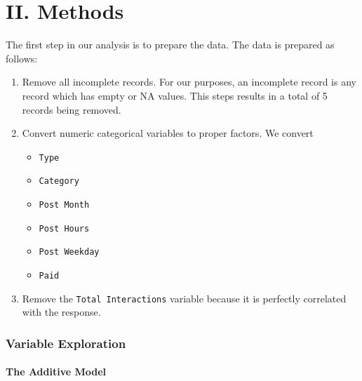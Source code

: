 \documentclass[
]{article}
\providecommand{\tightlist}{%
  \setlength{\itemsep}{0pt}\setlength{\parskip}{0pt}}
\begin{document}
\hypertarget{ii.-methods}{%
\section{\texorpdfstring{\textbf{II}.
Methods}{II. Methods}}\label{ii.-methods}}

The first step in our analysis is to prepare the data. The data is
prepared as follows:

\begin{enumerate}
\def\labelenumi{\arabic{enumi}.}
\tightlist
\item
  Remove all incomplete records. For our purposes, an incomplete record
  is any record which has empty or NA values. This steps results in a
  total of 5 records being removed.\\
\item
  Convert numeric categorical variables to proper factors. We convert

  \begin{itemize}
  \tightlist
  \item
    \texttt{Type}~\\
  \item
    \texttt{Category}~\\
  \item
    \texttt{Post\ Month}~\\
  \item
    \texttt{Post\ Hours}~\\
  \item
    \texttt{Post\ Weekday}~\\
  \item
    \texttt{Paid}~\\
  \end{itemize}
\item
  Remove the \texttt{Total\ Interactions} variable because it is
  perfectly correlated with the response.
\end{enumerate}

\hypertarget{variable-exploration}{%
\subsubsection{Variable Exploration}\label{variable-exploration}}

\hypertarget{the-additive-model}{%
\paragraph{The Additive Model}\label{the-additive-model}}
\end{document}
